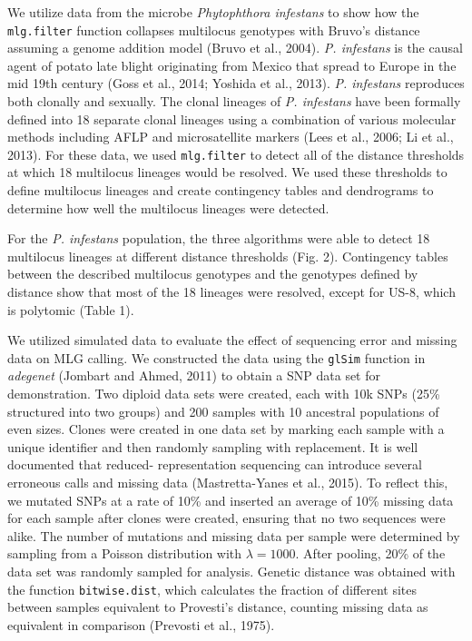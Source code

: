 \documentclass{frontiersSCNS} %
\begin{document}
We utilize data from the microbe \emph{Phytophthora infestans} to show
how the \texttt{mlg.filter} function collapses multilocus genotypes with
Bruvo's distance assuming a genome addition model (Bruvo et al., 2004).
\emph{P. infestans} is the causal agent of potato late blight
originating from Mexico that spread to Europe in the mid 19th century
(Goss et al., 2014; Yoshida et al., 2013). \emph{P. infestans}
reproduces both clonally and sexually. The clonal lineages of \emph{P.
infestans} have been formally defined into 18 separate clonal lineages
using a combination of various molecular methods including AFLP and
microsatellite markers (Lees et al., 2006; Li et al., 2013). For these
data, we used \texttt{mlg.filter} to detect all of the distance
thresholds at which 18 multilocus lineages would be resolved. We used
these thresholds to define multilocus lineages and create contingency
tables and dendrograms to determine how well the multilocus lineages
were detected.

For the \emph{P. infestans} population, the three algorithms were able
to detect 18 multilocus lineages at different distance thresholds (Fig.
2). Contingency tables between the described multilocus genotypes and
the genotypes defined by distance show that most of the 18 lineages were
resolved, except for US-8, which is polytomic (Table 1).

We utilized simulated data to evaluate the effect of sequencing error
and missing data on MLG calling. We constructed the data using the
\texttt{glSim} function in \emph{adegenet} (Jombart and Ahmed, 2011) to
obtain a SNP data set for demonstration. Two diploid data sets were
created, each with 10k SNPs (25\% structured into two groups) and 200
samples with 10 ancestral populations of even sizes. Clones were created
in one data set by marking each sample with a unique identifier and then
randomly sampling with replacement. It is well documented that reduced-
representation sequencing can introduce several erroneous calls and
missing data (Mastretta-Yanes et al., 2015). To reflect this, we mutated
SNPs at a rate of 10\% and inserted an average of 10\% missing data for
each sample after clones were created, ensuring that no two sequences
were alike. The number of mutations and missing data per sample were
determined by sampling from a Poisson distribution with
\(\lambda = 1000\). After pooling, 20\% of the data set was randomly
sampled for analysis. Genetic distance was obtained with the function
\texttt{bitwise.dist}, which calculates the fraction of different sites
between samples equivalent to Provesti's distance, counting missing data
as equivalent in comparison (Prevosti et al., 1975).
\end{document}
